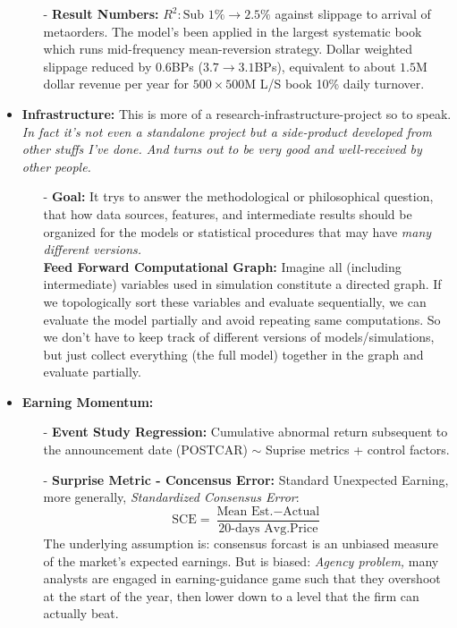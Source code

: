 \documentclass[9pt, landscape]{article}
\begin{document}
\begin{multicols*}{3}
\begin{itemize}
\begin{itemize}[leftmargin=10pt,noitemsep,topsep=0pt,partopsep=0pt]
		\item[-] \textbf{Result Numbers:} $R^2: \text{Sub } 1\% \to 2.5\%$ against slippage to arrival of metaorders. The model's been applied in the largest systematic book which runs mid-frequency mean-reversion strategy. Dollar weighted slippage reduced by 0.6BPs ($3.7 \to 3.1$BPs), equivalent to about $1.5$M dollar revenue per year for $500\times 500$M L/S book 10\% daily turnover.
	\end{itemize}
	\item \textbf{Infrastructure:} This is more of a research-infrastructure-project so to speak. \textit{In fact it's not even a standalone project but a side-product developed from other stuffs I've done. And turns out to be very good and well-received by other people.}
	\begin{itemize}[leftmargin=10pt,noitemsep,topsep=0pt,partopsep=0pt]
		\item[-] \textbf{Goal:} It trys to answer the methodological or philosophical question, that how data sources, features, and intermediate results should be organized for the models or statistical procedures that may have \textit{many different versions.}\\
		\textbf{Feed Forward Computational Graph:} Imagine all (including intermediate) variables used in simulation constitute a directed graph. If we topologically sort these variables and evaluate sequentially, we can evaluate the model partially and avoid repeating same computations. So we don't have to keep track of different versions of models/simulations, but just collect everything (the full model) together in the graph and evaluate partially.
	\end{itemize}
	\item \textbf{Earning Momentum:} 
	\begin{itemize}[leftmargin=10pt,noitemsep,topsep=0pt,partopsep=0pt]
		\item[-] \textbf{Event Study Regression:} Cumulative abnormal return subsequent to the announcement date (POSTCAR) $\sim$ Suprise metrics + control factors.
		\item[-] \textbf{Surprise Metric - Concensus Error:} Standard Unexpected Earning, more generally, \textit{Standardized Consensus Error}:
		$$
		\text{SCE} = \frac{\text{Mean Est.} - \text{Actual}}{\text{20-days Avg.Price}}
		$$
		The underlying assumption is: consensus forcast is an unbiased measure of the market's expected earnings. But is biased: \textit{Agency problem,} many analysts are engaged in earning-guidance game such that they overshoot at the start of the year, then lower down to a level that the firm can actually beat.\\

\end{itemize}
\end{itemize}
\end{multicols*}
\end{document}
